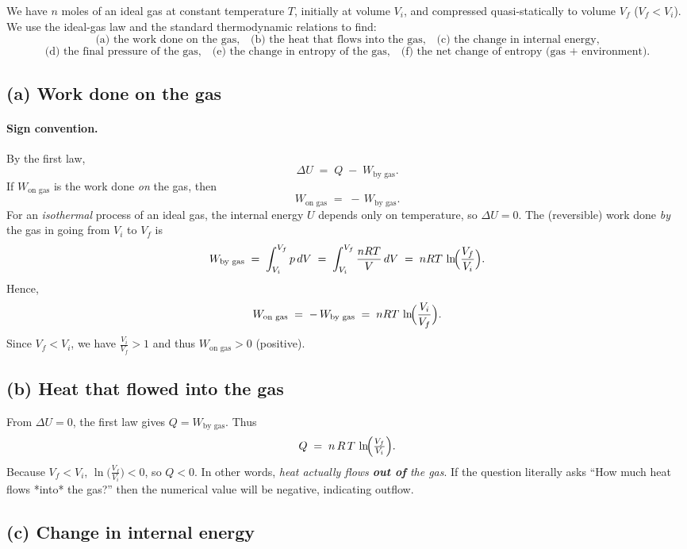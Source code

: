 \documentclass[12pt]{article}
\theoremstyle{definition} %
\theoremstyle{plain} %
\begin{document}
\noindent
We have $n$ moles of an ideal gas at constant temperature $T$, initially at volume $V_i$, and compressed quasi-statically to volume $V_f$ ($V_f < V_i$). We use the ideal-gas law and the standard thermodynamic relations to find:
\[
\text{(a) the work done on the gas,}\quad
\text{(b) the heat that flows into the gas,}\quad
\text{(c) the change in internal energy,}
\]
\[
\text{(d) the final pressure of the gas,}\quad
\text{(e) the change in entropy of the gas,}\quad
\text{(f) the net change of entropy (gas + environment).}
\]

\subsection*{(a) Work done on the gas}

\paragraph{Sign convention.} 
By the first law,
\[
\Delta U \;=\; Q \;-\; W_{\text{by gas}}.
\]
If $W_{\text{on gas}}$ is the work done \emph{on} the gas, then
\[
W_{\text{on gas}} \;=\; -\,W_{\text{by gas}}.
\]
For an \emph{isothermal} process of an ideal gas, the internal energy $U$ depends only on temperature, so $\Delta U = 0$. The (reversible) work done \emph{by} the gas in going from $V_i$ to $V_f$ is
\[
W_{\text{by gas}}
\;=\;
\int_{V_i}^{V_f} p\,dV
\;=\;
\int_{V_i}^{V_f} \frac{nRT}{V}\,dV
\;=\;
nRT\,\ln\!\Bigl(\frac{V_f}{V_i}\Bigr).
\]
Hence,
\[
W_{\text{on gas}}
\;=\;
-\,W_{\text{by gas}}
\;=\;
nRT\,\ln\!\Bigl(\frac{V_i}{V_f}\Bigr).
\]
Since $V_f < V_i$, we have $\tfrac{V_i}{V_f} > 1$ and thus $W_{\text{on gas}}>0$ (positive).

\subsection*{(b) Heat that flowed into the gas}

From $\Delta U = 0$, the first law gives $Q = W_{\text{by gas}}$. Thus
\[
Q
\;=\;
n\,R\,T \,\ln\!\Bigl(\tfrac{V_f}{V_i}\Bigr).
\]
Because $V_f < V_i$, $\ln\!\bigl(\tfrac{V_f}{V_i}\bigr)<0$, so $Q < 0$. 
In other words, \emph{heat actually flows \textbf{out of} the gas}.  
If the question literally asks “How much heat flows *into* the gas?” then the numerical value will be negative, indicating outflow.

\subsection*{(c) Change in internal energy}
\end{document}
